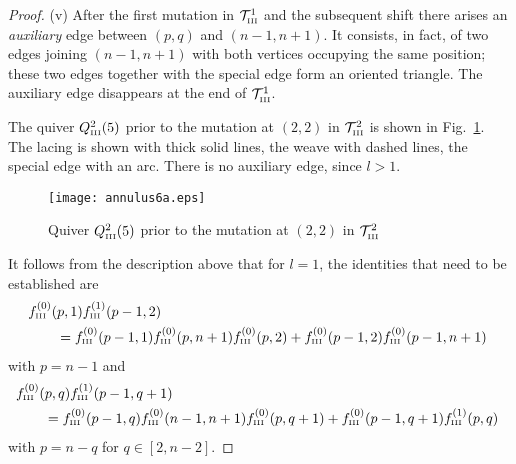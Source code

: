 \documentclass{amsart}
\theoremstyle{definition}
\theoremstyle{remark}
\numberwithin{equation}{section}
\numberwithin{theorem}{section}
\begin{document}
\begin{proof}
(v) After the first mutation in ${{\mathcal T}}^1_{\mbox{\tiny\rm III}}$ and the subsequent shift there arises an {\it auxiliary\/} edge between $(p,q)$ and $(n-1,n+1)$. It consists, in fact, of two edges joining $(n-1,n+1)$
with both vertices occupying the same position; these two edges together with the special edge form
an oriented triangle. The auxiliary edge disappears at the end of  ${{\mathcal T}}^1_{\mbox{\tiny\rm III}}$.

The quiver $Q^2_{\mbox{\tiny\rm III}}(5)$ prior to the mutation at $(2,2)$ in
${{\mathcal T}}^2_{\mbox{\tiny\rm III}}$ is shown in Fig.~\ref{fig:ann6}. The lacing is shown with thick solid
lines, the weave with dashed lines, the special edge with an arc. There is no auxiliary edge, since $l>1$.
 
 \begin{figure}[ht]
\begin{center}
\texttt{[image: annulus6a.eps]}
\caption{Quiver $Q^2_{\mbox{\tiny\rm III}}(5)$ prior to the mutation at $(2,2)$ in
${{\mathcal T}}^2_{\mbox{\tiny\rm III}}$ }
\label{fig:ann6}
\end{center}
\end{figure}

It follows from the description above that for $l=1$, 
the identities that need to be established are
\begin{align*}
&f^{(0)}_{\mbox{\tiny\rm III}} (p,1) f^{(1)}_{\mbox{\tiny\rm III}} (p-1,2) \\
&\qquad= f^{(0)}_{\mbox{\tiny\rm III}} (p-1,1) f^{(0)}_{\mbox{\tiny\rm III}}(p,n+1) f^{(0)}_{\mbox{\tiny\rm III}} (p,2) + f^{(0)}_{\mbox{\tiny\rm III}} (p-1,2) f_{\mbox{\tiny\rm III}}^{(0)}(p-1, n+1)\ 
\end{align*}
with $p=n-1$ and
\begin{align*}
&f^{(0)}_{\mbox{\tiny\rm III}} (p,q) f^{(1)}_{\mbox{\tiny\rm III}} (p-1,q+1)\\
&\qquad = f^{(0)}_{\mbox{\tiny\rm III}} (p-1,q) f^{(0)}_{\mbox{\tiny\rm III}}(n-1,n+1) f^{(0)}_{\mbox{\tiny\rm III}} (p,q+1) + f^{(0)}_{\mbox{\tiny\rm III}} (p-1,q+1) f_{\mbox{\tiny\rm III}}^{(1)}(p, q)\ 
\end{align*}
with $p=n-q$ for $q\in [2,n-2]$.


\end{proof}
\end{document}
